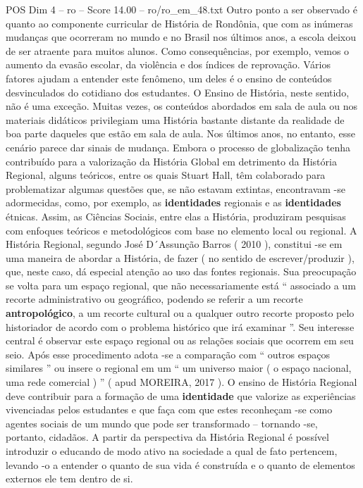 \begin{textsample}{POS Dim 4 – ro – Score 14.00 – ro/ro\_em\_48.txt}
Outro ponto a ser observado é quanto ao componente curricular de História de Rondônia, que com as inúmeras mudanças que ocorreram no mundo e no Brasil nos últimos anos, a escola deixou de ser atraente para muitos alunos.
Como consequências, por exemplo, vemos o aumento da evasão escolar, da violência e dos índices de reprovação.
Vários fatores ajudam a entender este fenômeno, um deles é o ensino de conteúdos desvinculados do cotidiano dos estudantes.
O Ensino de História, neste sentido, não é uma exceção.
Muitas vezes, os conteúdos abordados em sala de aula ou nos materiais didáticos privilegiam uma História bastante distante da realidade de boa parte daqueles que estão em sala de aula.
Nos últimos anos, no entanto, esse cenário parece dar sinais de mudança.
Embora o processo de globalização tenha contribuído para a valorização da História Global em detrimento da História Regional, alguns teóricos, entre os quais Stuart Hall, têm colaborado para problematizar algumas questões que, se não estavam extintas, encontravam -se adormecidas, como, por exemplo, as \textbf{identidades} regionais e as \textbf{identidades} étnicas.
Assim, as Ciências Sociais, entre elas a História, produziram pesquisas com enfoques teóricos e metodológicos com base no elemento local ou regional.
A História Regional, segundo José D´Assunção Barros ( 2010 ), constitui -se em uma maneira de abordar a História, de fazer ( no sentido de escrever/produzir ), que, neste caso, dá especial atenção ao uso das fontes regionais.
Sua preocupação se volta para um espaço regional, que não necessariamente está “ associado a um recorte administrativo ou geográfico, podendo se referir a um recorte \textbf{antropológico}, a um recorte cultural ou a qualquer outro recorte proposto pelo historiador de acordo com o problema histórico que irá examinar ”.
Seu interesse central é observar este espaço regional ou as relações sociais que ocorrem em seu seio.
Após esse procedimento adota -se a comparação com “ outros espaços similares ” ou insere o regional em um “ um universo maior ( o espaço nacional, uma rede comercial ) ” ( apud MOREIRA, 2017 ).
O ensino de História Regional deve contribuir para a formação de uma \textbf{identidade} que valorize as experiências vivenciadas pelos estudantes e que faça com que estes reconheçam -se como agentes sociais de um mundo que pode ser transformado – tornando -se, portanto, cidadãos.
A partir da perspectiva da História Regional é possível introduzir o educando de modo ativo na sociedade a qual de fato pertencem, levando -o a entender o quanto de sua vida é construída e o quanto de elementos externos ele tem dentro de si.

\end{textsample}

